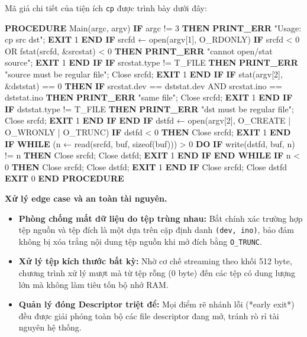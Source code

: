 \documentclass[12pt,a4paper]{article}
\newenvironment{algorithmblock}[1]{%
  \begin{tcolorbox}[
    enhanced,
    breakable,
    colback=white,
    colframe=primary!55,
    colbacktitle=primary,
    coltitle=white,
    boxrule=0.7pt,
    arc=2pt,
    left=10pt,right=10pt,top=7pt,bottom=8pt,
    title={#1},
    fonttitle=\small
  ]
}{%
  \end{tcolorbox}
}
\begin{document}
Mã giả chi tiết của tiện ích \texttt{cp} được trình bày dưới đây:

\begin{algorithmblock}{\texttt{cp}}
\begin{algorithmcode}
\textbf{PROCEDURE} Main(argc, argv)
    \textbf{IF} argc != 3 \textbf{THEN}
        \textbf{PRINT\_ERR} "Usage: cp src dst"; \textbf{EXIT} 1
    \textbf{END IF}
    srcfd ← open(argv[1], O_RDONLY)
    \textbf{IF} srcfd < 0 OR fstat(srcfd, &srcstat) < 0 \textbf{THEN}
        \textbf{PRINT\_ERR} "cannot open/stat source"; \textbf{EXIT} 1
    \textbf{END IF}
    \textbf{IF} srcstat.type != T_FILE \textbf{THEN}
        \textbf{PRINT\_ERR} "source must be regular file"; Close srcfd; \textbf{EXIT} 1
    \textbf{END IF}
    \textbf{IF} stat(argv[2], &dststat) == 0 \textbf{THEN}
        \textbf{IF} srcstat.dev == dststat.dev AND srcstat.ino == dststat.ino \textbf{THEN}
            \textbf{PRINT\_ERR} "same file"; Close srcfd; \textbf{EXIT} 1
        \textbf{END IF}
        \textbf{IF} dststat.type != T_FILE \textbf{THEN}
            \textbf{PRINT\_ERR} "dst must be regular file"; Close srcfd; \textbf{EXIT} 1
        \textbf{END IF}
    \textbf{END IF}
    dstfd ← open(argv[2], O_CREATE | O_WRONLY | O_TRUNC)
    \textbf{IF} dstfd < 0 \textbf{THEN}
        Close srcfd; \textbf{EXIT} 1
    \textbf{END IF}
    \textbf{WHILE} (n ← read(srcfd, buf, sizeof(buf))) > 0 \textbf{DO}
        \textbf{IF} write(dstfd, buf, n) != n \textbf{THEN}
            Close srcfd; Close dstfd; \textbf{EXIT} 1
        \textbf{END IF}
    \textbf{END WHILE}
    \textbf{IF} n < 0 \textbf{THEN}
        Close srcfd; Close dstfd; \textbf{EXIT} 1
    \textbf{END IF}
    Close srcfd; Close dstfd
    \textbf{EXIT} 0
\textbf{END PROCEDURE}
\end{algorithmcode}
\end{algorithmblock}

\textbf{Xử lý edge case và an toàn tài nguyên.}
\begin{itemize}
  \item \textbf{Phòng chống mất dữ liệu do tệp trùng nhau:} Bắt chính xác trường hợp tệp nguồn và tệp đích là một dựa trên cặp định danh \texttt{(dev, ino)}, bảo đảm không bị xóa trắng nội dung tệp nguồn khi mở đích bằng \texttt{O\_TRUNC}.
  \item \textbf{Xử lý tệp kích thước bất kỳ:} Nhờ cơ chế streaming theo khối 512 byte, chương trình xử lý mượt mà từ tệp rỗng (0 byte) đến các tệp có dung lượng lớn mà không làm tiêu tốn bộ nhớ RAM.
  \item \textbf{Quản lý đóng Descriptor triệt để:} Mọi điểm rẽ nhánh lỗi (*early exit*) đều được giải phóng toàn bộ các file descriptor đang mở, tránh rò rỉ tài nguyên hệ thống.
\end{itemize}
\end{document}
